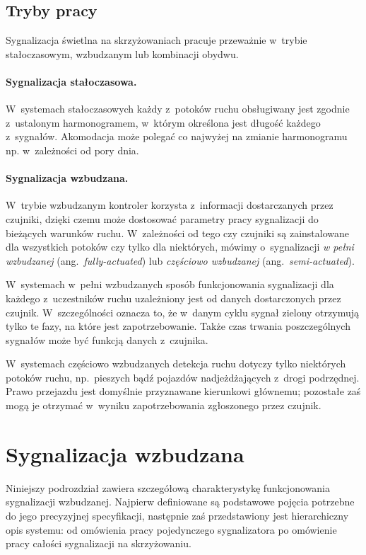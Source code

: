 \documentclass{pracamgr}
\newcommand{\ang}[1]{(ang.~\emph{#1})}
\theoremstyle{plain}
\begin{document}
\subsection{Tryby pracy}
\label{ss:tryby} Sygnalizacja świetlna na skrzyżowaniach pracuje
przeważnie w~trybie stałoczasowym, wzbudzanym lub kombinacji obydwu.

\paragraph{Sygnalizacja stałoczasowa.} W~systemach stałoczasowych każdy
z~potoków ruchu obsługiwany jest zgodnie z~ustalonym harmonogramem,
w~którym określona jest długość każdego z~sygnałów. Akomodacja może
polegać co najwyżej na zmianie harmonogramu np. w~zależności od pory dnia.

\paragraph{Sygnalizacja wzbudzana.}
W~trybie wzbudzanym kontroler korzysta z~informacji dostarczanych
przez czujniki, dzięki czemu może dostosować parametry pracy
sygnalizacji do bieżących warunków ruchu. W~zależności od tego czy
czujniki są zainstalowane dla wszystkich potoków czy tylko dla
niektórych, mówimy o~sygnalizacji \emph{w pełni wzbudzanej}
\ang{fully-actuated} lub \emph{częściowo wzbudzanej}
\ang{semi-actuated}.

W~systemach w~pełni wzbudzanych sposób funkcjonowania sygnalizacji dla
każdego z~uczestników ruchu uzależniony jest od danych dostarczonych
przez czujnik.  W~szczególności oznacza to, że w~danym cyklu sygnał
zielony otrzymują tylko te fazy, na które jest zapotrzebowanie. Także
czas trwania poszczególnych sygnałów może być funkcją danych
z~czujnika.

W~systemach częściowo wzbudzanych detekcja ruchu dotyczy tylko
niektórych potoków ruchu, np.~pieszych bądź pojazdów nadjeżdżających
z~drogi podrzędnej. Prawo przejazdu jest domyślnie przyznawane
kierunkowi głównemu; pozostałe zaś mogą je otrzymać w~wyniku
zapotrzebowania zgłoszonego przez czujnik.

\section{Sygnalizacja wzbudzana}
\label{s:sygn-szczegoly}

Niniejszy podrozdział zawiera szczegółową charakterystykę
funkcjonowania sygnalizacji wzbudzanej. Najpierw definiowane są
podstawowe pojęcia potrzebne do jego precyzyjnej specyfikacji,
następnie zaś przedstawiony jest hierarchiczny opis systemu: od
omówienia pracy pojedynczego sygnalizatora po omówienie pracy całości
sygnalizacji na skrzyżowaniu.
\end{document}

